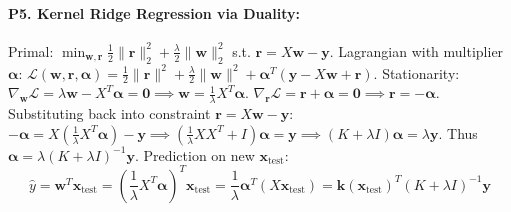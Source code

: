 \paragraph{P5. Kernel Ridge Regression via Duality:}
Primal: $\min_{\mathbf{w}, \mathbf{r}} \frac{1}{2}\|\mathbf{r}\|_2^2 + \frac{\lambda}{2}\|\mathbf{w}\|_2^2$ s.t. $\mathbf{r} = X\mathbf{w} - \mathbf{y}$.
Lagrangian with multiplier $\boldsymbol{\alpha}$: $\mathcal{L}(\mathbf{w}, \mathbf{r}, \boldsymbol{\alpha}) = \frac{1}{2}\|\mathbf{r}\|^2 + \frac{\lambda}{2}\|\mathbf{w}\|^2 + \boldsymbol{\alpha}^T (\mathbf{y} - X\mathbf{w} + \mathbf{r})$.
Stationarity:
$\nabla_{\mathbf{w}} \mathcal{L} = \lambda \mathbf{w} - X^T \boldsymbol{\alpha} = \mathbf{0} \implies \mathbf{w} = \frac{1}{\lambda} X^T \boldsymbol{\alpha}$.
$\nabla_{\mathbf{r}} \mathcal{L} = \mathbf{r} + \boldsymbol{\alpha} = \mathbf{0} \implies \mathbf{r} = -\boldsymbol{\alpha}$.
Substituting back into constraint $\mathbf{r} = X\mathbf{w} - \mathbf{y}$:
$-\boldsymbol{\alpha} = X\left(\frac{1}{\lambda}X^T \boldsymbol{\alpha}\right) - \mathbf{y} \implies \left( \frac{1}{\lambda}X X^T + I \right)\boldsymbol{\alpha} = \mathbf{y} \implies (K + \lambda I)\boldsymbol{\alpha} = \lambda \mathbf{y}$.
Thus $\boldsymbol{\alpha} = \lambda(K + \lambda I)^{-1}\mathbf{y}$.
Prediction on new $\mathbf{x}_{\text{test}}$:
\begin{equation*}
\hat{y} = \mathbf{w}^T \mathbf{x}_{\text{test}} = \left(\frac{1}{\lambda} X^T \boldsymbol{\alpha}\right)^T \mathbf{x}_{\text{test}} = \frac{1}{\lambda} \boldsymbol{\alpha}^T (X \mathbf{x}_{\text{test}}) = \mathbf{k}(\mathbf{x}_{\text{test}})^T (K + \lambda I)^{-1}\mathbf{y}
\end{equation*}

